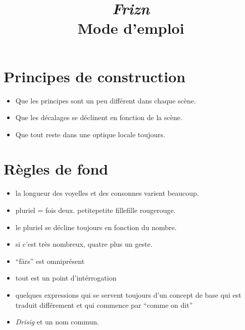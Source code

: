 \documentclass[a4paper]{article}
\title{\emph{Frizn}\\Mode d'emploi}
\author{}
\date{}
\begin{document}
\maketitle
\section{Principes de construction}
\begin{itemize}
\item Que les principes sont un peu différent dans chaque scène.
\item Que les décalages se déclinent en fonction de la scène.
\item Que tout reste dans une optique locale toujours.
\end{itemize}

\section{Règles de fond}
\begin{itemize}
\item la longueur des voyelles et des consonnes varient beaucoup.

\item pluriel = fois deux. petitepetite fillefille rougerouge.
\item le pluriel se décline toujours en fonction du nombre.
\item si c'est très nombreux, quatre plus un geste.

\item ``fårs'' est omniprésent
\item tout est un point d'intérrogation

\item quelques expressions qui se servent toujours d'un concept de base qui
est traduit différement et qui commence par ``comme on dit''

\item \emph{Drisig} et un nom commun.
\end{itemize}
\end{document}
